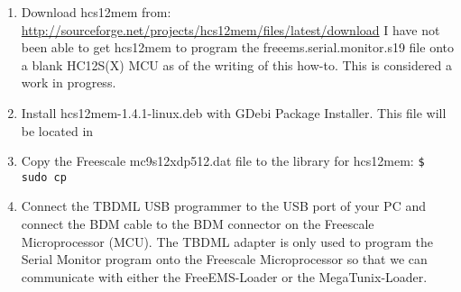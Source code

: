 \documentclass[12pt,notitlepage,onecolumn,oneside,openany]{memoir}
\begin{document}
\begin{enumerate}
\item \textsf{Download hcs12mem from:} \newline
      \url{http://sourceforge.net/projects/hcs12mem/files/latest/download} \newline
      \textsf{I have not been able to get hcs12mem to program the freeems.serial.monitor.s19 file onto a blank HC12S(X) MCU as of the writing of this how-to.  This is considered a work in progress.} 

\item \textsf{Install hcs12mem-1.4.1-linux.deb with GDebi Package Installer. This file will be located in} \newline

\item \textsf{Copy the Freescale mc9s12xdp512.dat file to the library for hcs12mem:} \newline
      \texttt{\$ sudo cp } 

\item \textsf{Connect the TBDML USB programmer to the USB port of your PC and connect the BDM cable to the BDM connector on the Freescale Microprocessor (MCU).  The TBDML adapter is only used to program the Serial Monitor program onto the Freescale Microprocessor so that we can communicate with either the FreeEMS-Loader or the MegaTunix-Loader.}


\end{enumerate}
\end{document}
